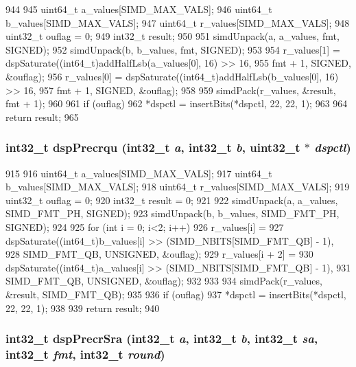 \begin{DoxyCode}
944 {
945     uint64_t a_values[SIMD_MAX_VALS];
946     uint64_t b_values[SIMD_MAX_VALS];
947     uint64_t r_values[SIMD_MAX_VALS];
948     uint32_t ouflag = 0;
949     int32_t result;
950 
951     simdUnpack(a, a_values, fmt, SIGNED);
952     simdUnpack(b, b_values, fmt, SIGNED);
953 
954     r_values[1] = dspSaturate((int64_t)addHalfLsb(a_values[0], 16) >> 16,
955                               fmt + 1, SIGNED, &ouflag);
956     r_values[0] = dspSaturate((int64_t)addHalfLsb(b_values[0], 16) >> 16,
957                               fmt + 1, SIGNED, &ouflag);
958 
959     simdPack(r_values, &result, fmt + 1);
960 
961     if (ouflag)
962         *dspctl = insertBits(*dspctl, 22, 22, 1);
963 
964     return result;
965 }
\end{DoxyCode}
\hypertarget{namespaceMipsISA_a9f4e496d59bfdc8529c9d569723a1d30}{
\subsubsection[{dspPrecrqu}]{\setlength{\rightskip}{0pt plus 5cm}int32\_\-t dspPrecrqu (int32\_\-t {\em a}, \/  int32\_\-t {\em b}, \/  {\bf uint32\_\-t} $\ast$ {\em dspctl})}}
\label{namespaceMipsISA_a9f4e496d59bfdc8529c9d569723a1d30}



\begin{DoxyCode}
915 {
916     uint64_t a_values[SIMD_MAX_VALS];
917     uint64_t b_values[SIMD_MAX_VALS];
918     uint64_t r_values[SIMD_MAX_VALS];
919     uint32_t ouflag = 0;
920     int32_t result = 0;
921 
922     simdUnpack(a, a_values, SIMD_FMT_PH, SIGNED);
923     simdUnpack(b, b_values, SIMD_FMT_PH, SIGNED);
924 
925     for (int i = 0; i<2; i++) {
926         r_values[i] =
927             dspSaturate((int64_t)b_values[i] >> (SIMD_NBITS[SIMD_FMT_QB] - 1),
928                         SIMD_FMT_QB, UNSIGNED, &ouflag);
929         r_values[i + 2] =
930             dspSaturate((int64_t)a_values[i] >> (SIMD_NBITS[SIMD_FMT_QB] - 1),
931                         SIMD_FMT_QB, UNSIGNED, &ouflag);
932     }
933 
934     simdPack(r_values, &result, SIMD_FMT_QB);
935 
936     if (ouflag)
937         *dspctl = insertBits(*dspctl, 22, 22, 1);
938 
939     return result;
940 }
\end{DoxyCode}
\hypertarget{namespaceMipsISA_a5211ce9eb66240a16ac897bca368a8f4}{
\subsubsection[{dspPrecrSra}]{\setlength{\rightskip}{0pt plus 5cm}int32\_\-t dspPrecrSra (int32\_\-t {\em a}, \/  int32\_\-t {\em b}, \/  int32\_\-t {\em sa}, \/  int32\_\-t {\em fmt}, \/  int32\_\-t {\em round})}}
\label{namespaceMipsISA_a5211ce9eb66240a16ac897bca368a8f4}



